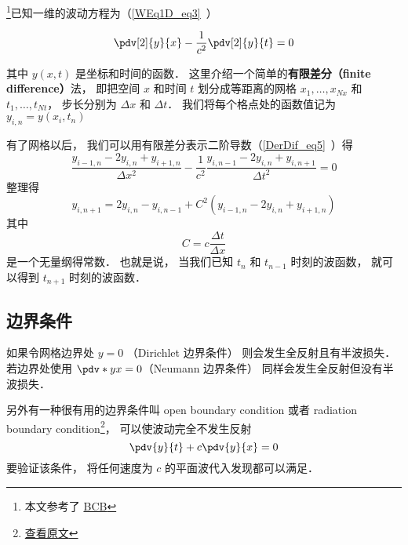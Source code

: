 

\footnote{本文参考了 \href{http://hplgit.github.io/num-methods-for-PDEs/doc/pub/wave/sphinx/._main_wave001.html\#discretizing-the-domain}{BCB}}已知一维的波动方程为（\autoref{WEq1D_eq3}~）

\begin{equation}
\pdv[2]{y}{x} - \frac{1}{c^2}\pdv[2]{y}{t} = 0
\end{equation}

其中 $y(x, t)$ 是坐标和时间的函数． 这里介绍一个简单的\textbf{有限差分（finite difference）}法， 即把空间 $x$ 和时间 $t$ 划分成等距离的网格 $x_1, \dots, x_{Nx}$ 和 $t_1, \dots, t_{Nt}$， 步长分别为 $\Delta x$ 和 $\Delta t$． 我们将每个格点处的函数值记为 $y_{i,n} = y(x_i, t_n)$

有了网格以后， 我们可以用有限差分表示二阶导数（\autoref{DerDif_eq5}~）得
\begin{equation}
\frac{y_{i-1,n} - 2y_{i,n} + y_{i+1,n}}{\Delta x^2} - \frac{1}{c^2} \frac{y_{i, n-1} - 2y_{i, n} + y_{i, n+1}}{\Delta t^2} = 0
\end{equation}
整理得
\begin{equation}
y_{i, n+1} = 2y_{i, n} - y_{i, n-1} + C^2(y_{i-1,n} - 2y_{i,n} + y_{i+1,n})
\end{equation}
其中
\begin{equation}
C = c \frac{\Delta t}{\Delta x}
\end{equation}
是一个无量纲得常数． 也就是说， 当我们已知 $t_n$ 和 $t_{n-1}$ 时刻的波函数， 就可以得到 $t_{n+1}$ 时刻的波函数．

\subsection{边界条件}
如果令网格边界处 $y = 0$ （Dirichlet 边界条件） 则会发生全反射且有半波损失． 若边界处使用 $\pdv*{y}{x} = 0$（Neumann 边界条件） 同样会发生全反射但没有半波损失．

另外有一种很有用的边界条件叫 open boundary condition 或者 radiation boundary condition\footnote{\href{http://hplgit.github.io/num-methods-for-PDEs/doc/pub/wave/sphinx/._main_wave003.html\#problem-11-implement-open-boundary-conditions}{查看原文}}， 可以使波动完全不发生反射
\begin{equation}\label{W1dNum_eq1}
\pdv{y}{t} + c\pdv{y}{x} = 0
\end{equation}
要验证该条件， 将任何速度为 $c$ 的平面波代入发现都可以满足．

